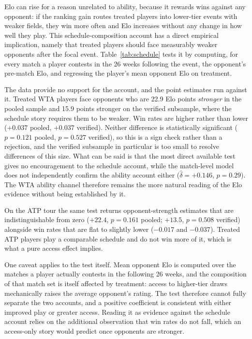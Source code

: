 Elo can rise for a reason unrelated to ability, because it rewards wins against any opponent: if the ranking gain routes treated players into lower-tier events with weaker fields, they win more often and Elo increases without any change in how well they play. This schedule-composition account has a direct empirical implication, namely that treated players should face measurably weaker opponents after the focal event. Table~\ref{tab:schedule} tests it by computing, for every match a player contests in the 26 weeks following the event, the opponent's pre-match Elo, and regressing the player's mean opponent Elo on treatment.

The data provide no support for the account, and the point estimates run against it. Treated WTA players face opponents who are 22.9 Elo points \textit{stronger} in the pooled sample and 15.9 points stronger on the verified subsample, where the schedule story requires them to be weaker. Win rates are higher rather than lower ($+0.037$ pooled, $+0.037$ verified). Neither difference is statistically significant ($p = 0.121$ pooled, $p = 0.527$ verified), so this is a sign check rather than a rejection, and the verified subsample in particular is too small to resolve differences of this size. What can be said is that the most direct available test gives no encouragement to the schedule account, while the match-level model does not independently confirm the ability account either ($\hat{\delta} = +0.146$, $p = 0.29$). The WTA ability channel therefore remains the more natural reading of the Elo evidence without being established by it.

On the ATP tour the same test returns opponent-strength estimates that are indistinguishable from zero ($+22.4$, $p = 0.161$ pooled; $+13.5$, $p = 0.508$ verified) alongside win rates that are flat to slightly lower ($-0.017$ and $-0.037$). Treated ATP players play a comparable schedule and do not win more of it, which is what a pure access effect implies.

One caveat applies to the test itself. Mean opponent Elo is computed over the matches a player actually contests in the following 26 weeks, and the composition of that match set is itself affected by treatment: access to higher-tier draws mechanically raises the average opponent's rating. The test therefore cannot fully separate the two accounts, and a positive coefficient is consistent with either improved play or greater access. Reading it as evidence against the schedule account relies on the additional observation that win rates do not fall, which an access-only story would predict once opponents are stronger.

